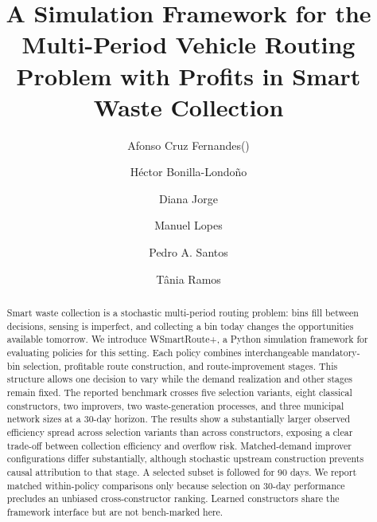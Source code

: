 \documentclass[orivec,runningheads]{llncs}
\newcommand{\corr}{(\Letter)}
\begin{document}
\title{A Simulation Framework for the Multi-Period Vehicle Routing Problem with Profits in Smart Waste Collection}

\author{Afonso Cruz Fernandes\corr \and
H\'ector Bonilla-Londo\~no \and
Diana Jorge \and
Manuel Lopes \and
Pedro A. Santos \and
T\^ania Ramos}


\maketitle              %

\begin{abstract}
Smart waste collection is a stochastic multi-period routing problem: bins fill
between decisions, sensing is imperfect, and collecting a bin today changes the
opportunities available tomorrow. We introduce WSmartRoute+, a Python
simulation framework for evaluating policies for this setting. Each policy
combines interchangeable mandatory-bin selection, profitable route construction,
and route-improvement stages. This structure allows one decision to vary while
the demand realization and other stages remain fixed. The reported
benchmark crosses five selection variants, eight classical constructors, two
improvers, two waste-generation processes, and three municipal network sizes at
a 30-day horizon. The results show a substantially larger observed efficiency
spread across selection variants than across constructors, exposing a clear
trade-off between collection efficiency and overflow risk. Matched-demand
improver configurations differ substantially, although stochastic upstream
construction prevents causal attribution to that stage. A selected subset is
followed for 90 days. We report matched within-policy comparisons only because
selection on 30-day performance precludes an unbiased cross-constructor ranking.
Learned constructors share the framework interface but are not bench-marked here.
\end{abstract}
\end{document}
